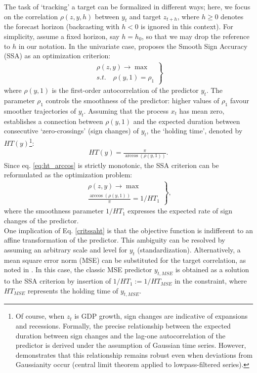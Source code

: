 \documentclass[11pt,a4paper]{article}
\begin{document}
The task of `tracking' a target can be formalized in different ways; here, we focus on the correlation $\rho(z,y,h)$ between $y_t$ and target $z_{t+h}$, where $h\geq 0$ denotes the forecast horizon (backcasting with $h<0$ is ignored in this context). For simplicity, assume a fixed horizon, say $h=h_0$, so that we may drop the reference to $h$ in our notation. In the univariate case, \cite{Wildi2025} proposes the Smooth Sign Accuracy (SSA) as an optimization criterion:
\begin{eqnarray}\label{critssa}
\left.\begin{array}{c}\rho(z,y)\to\max\\
s.t. \quad \rho(y,1)=\rho_1\end{array}\right\}
\end{eqnarray}
where $\rho(y,1)$ is the first-order autocorrelation of the predictor $y_t$. The parameter $\rho_1$ controls the smoothness of the predictor: higher values of $\rho_1$ favour smoother trajectories of $y_t$. Assuming that the process $x_t$ has mean zero, \cite{Wildi2024} establishes a connection between $\rho(y,1)$ and the expected duration between consecutive `zero-crossings' (sign changes) of $y_t$, the `holding time', denoted by $HT(y)$\footnote{Of course, when $z_t$ is GDP growth, sign changes are indicative of expansions and recessions. Formally, the precise relationship between the expected duration between sign changes and the lag-one autocorrelation of the predictor is derived under the assumption of Gaussian time series. However, \cite{Wildi2024} demonstrates that this relationship remains robust even when deviations from Gaussianity occur (central limit theorem applied to lowpass-filtered series).}:
\begin{eqnarray}\label{ht}
HT(y)=\frac{\pi}{\arccos(\rho(y,1))}.
\label{eq:ht_arccos}
\end{eqnarray}
Since eq. \ref{eq:ht_arccos} is strictly monotonic, the SSA criterion can be reformulated as the optimization problem:
\begin{eqnarray}\label{critssaht}
\left.\begin{array}{c}\rho(z,y)\to\max\\
\frac{\arccos(\rho(y,1))}{\pi}=1/HT_1\end{array}\right\},
\end{eqnarray}
where the smoothness parameter $1/HT_1$ expresses the expected rate of sign changes of the predictor. \\


One implication of Eq. \eqref{critssaht} is that the objective function is indifferent to an affine transformation of the predictor. This ambiguity can be resolved by assuming an arbitrary scale and level for $y_t$ (standardization). Alternatively, a mean square error norm (MSE) can be substituted for the target correlation, as noted in \cite{Wildi2025}. In this case, the classic MSE predictor $y_{t,MSE}$ is obtained as a solution to the SSA criterion by insertion of $1/HT_1:=1/HT_{MSE}$ in the constraint, where $HT_{MSE}$ represents the holding time of $y_{t,MSE}$. %
\end{document}
